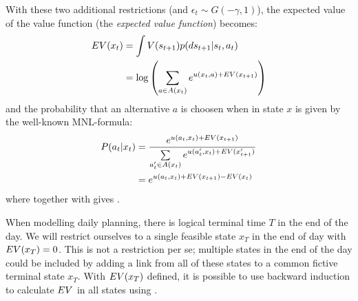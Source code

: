 With these two additional restrictions (and $\epsilon_t \sim G(-\gamma,1)$), the expected value of the value function (the \emph{expected value function}) becomes:%
\begin{equation} \label{eq:EV}
\begin{aligned}
\eutil(x_t) &= \int V(s_{t+1})p(ds_{t+1}|s_t,a_t) \\&= \log\left(\sum_{a\in A(x_t)}e^{u(x_t,a) + \eutil(x_{t+1})}\right)
\end{aligned}
\end{equation}
and the probability that an alternative $a$ is choosen when in state $x$ is given by the well-known MNL-formula:
\begin{align}
P(a_t|x_t) &= \frac{e^{u(a_t,x_t) + \eutil(x_{t+1})} }{\sum\limits_{a_t'\in A(x_t)} e^{u(a_t',x_t) + \eutil(x_{t+1}')}} \label{eq:MNL} \\
&=e^{u(a_t,x_t) + \eutil(x_{t+1})- \eutil(x_t)}\label{eq:MNLv2}
\end{align}
where  together with  gives .

When modelling daily planning, there is logical terminal time $T$ in the end of the day. We will restrict ourselves to a single feasible state $x_T$ in the end of day with $EV(x_T) = 0$. This is not a restriction per se; multiple states in the end of the day could be included by adding a link from all of these states to a common fictive terminal state $x_T$. With $EV(x_T)$ defined, it is possible to use backward induction to calculate $EV$ in all states using .







